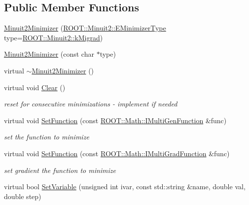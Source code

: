 \subsection*{Public Member Functions}
\begin{DoxyCompactItemize}
\item 
\mbox{\hyperlink{classROOT_1_1Minuit2_1_1Minuit2Minimizer_a0b75191bcd9e23e8dd5fbe6629c01704}{Minuit2\+Minimizer}} (\mbox{\hyperlink{namespaceROOT_1_1Minuit2_abdfae3dff24b1dc5a23955c06fe2a8d6}{R\+O\+O\+T\+::\+Minuit2\+::\+E\+Minimizer\+Type}} type=\mbox{\hyperlink{namespaceROOT_1_1Minuit2_abdfae3dff24b1dc5a23955c06fe2a8d6ad4b108176192edd930579158f0467e8f}{R\+O\+O\+T\+::\+Minuit2\+::k\+Migrad}})
\item 
\mbox{\hyperlink{classROOT_1_1Minuit2_1_1Minuit2Minimizer_aab2c36bd9eb8229d205b00d9573f550d}{Minuit2\+Minimizer}} (const char $\ast$type)
\item 
virtual \mbox{\hyperlink{classROOT_1_1Minuit2_1_1Minuit2Minimizer_ac46ec7e45b826edeeee858208bf9b01f}{$\sim$\+Minuit2\+Minimizer}} ()
\item 
virtual void \mbox{\hyperlink{classROOT_1_1Minuit2_1_1Minuit2Minimizer_a11e6ce9a4285080548f9855b78ca83b4}{Clear}} ()
\begin{DoxyCompactList}\small\item\em reset for consecutive minimizations -\/ implement if needed \end{DoxyCompactList}\item 
virtual void \mbox{\hyperlink{classROOT_1_1Minuit2_1_1Minuit2Minimizer_ae18efc66a943fe11b1114ff8c1b28ad0}{Set\+Function}} (const \mbox{\hyperlink{namespaceROOT_1_1Math_aec22897f3d759f7c284893c81d980799}{R\+O\+O\+T\+::\+Math\+::\+I\+Multi\+Gen\+Function}} \&func)
\begin{DoxyCompactList}\small\item\em set the function to minimize \end{DoxyCompactList}\item 
virtual void \mbox{\hyperlink{classROOT_1_1Minuit2_1_1Minuit2Minimizer_aeb98c40cf3486fe8fb9bec4da0f7942e}{Set\+Function}} (const \mbox{\hyperlink{namespaceROOT_1_1Math_a014e019aaf9304a00e9231bd9ed232fb}{R\+O\+O\+T\+::\+Math\+::\+I\+Multi\+Grad\+Function}} \&func)
\begin{DoxyCompactList}\small\item\em set gradient the function to minimize \end{DoxyCompactList}\item 
virtual bool \mbox{\hyperlink{classROOT_1_1Minuit2_1_1Minuit2Minimizer_a951ad856f74ded3c64836fa28fdf9bb5}{Set\+Variable}} (unsigned int ivar, const std\+::string \&name, double val, double step)

\end{DoxyCompactItemize}
